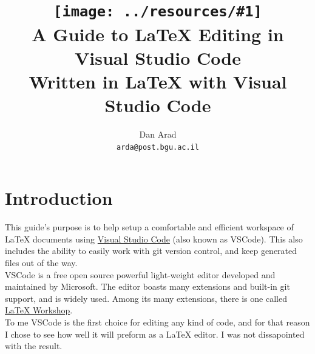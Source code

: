 \documentclass{article}
\newcommand{\latex}{\LaTeX\xspace}
\newcommand{\email}[1]{\texttt{#1}}
\newcommand{\icon}[2]{\texttt{[image: ../resources/\#1]}\xspace}
\begin{document}
\title{
	\icon{vscode_icon.png}{0.05}\\
	A Guide to \latex Editing in Visual Studio Code\\
	\large Written in \latex with Visual Studio Code
}
\author{
	Dan Arad\\
	\email{arda@post.bgu.ac.il}
}
\maketitle

\section{Introduction} \label{sec:introduction}
This guide's purpose is to help setup a comfortable and efficient workspace of \latex documents using \href{https://code.visualstudio.com/}{Visual Studio Code} (also known as VSCode). This also includes the ability to easily work with git version control, and keep generated files out of the way.\\
VSCode is a free open source powerful light-weight editor developed and maintained by Microsoft. The editor boasts many extensions and built-in git support, and is widely used. Among its many extensions, there is one called \href{https://marketplace.visualstudio.com/items?itemName=James-Yu.latex-workshop}{\latex Workshop}.\\
To me VSCode is the first choice for editing any kind of code, and for that reason I chose to see how well it will preform as a \latex editor. I was not dissapointed with the result.
\end{document}
